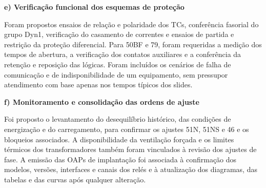 \textbf{e) Verificação funcional dos esquemas de proteção}

Foram propostos ensaios de relação e polaridade dos TCs, conferência fasorial do grupo Dyn1, verificação do casamento de correntes e ensaios de partida e restrição da proteção diferencial. Para 50BF e 79, foram requeridas a medição dos tempos de abertura, a verificação dos contatos auxiliares e a conferência da retenção e reposição das lógicas. Foram incluídos os cenários de falha de comunicação e de indisponibilidade de um equipamento, sem pressupor atendimento com base apenas nos tempos típicos dos slides.

\textbf{f) Monitoramento e consolidação das ordens de ajuste}

Foi proposto o levantamento do desequilíbrio histórico, das condições de energização e do carregamento, para confirmar os ajustes 51N, 51NS e 46 e os bloqueios associados. A disponibilidade da ventilação forçada e os limites térmicos dos transformadores também foram vinculados à revisão dos ajustes de fase. A emissão das OAPs de implantação foi associada à confirmação dos modelos, versões, interfaces e canais dos relés e à atualização dos diagramas, das tabelas e das curvas após qualquer alteração.
